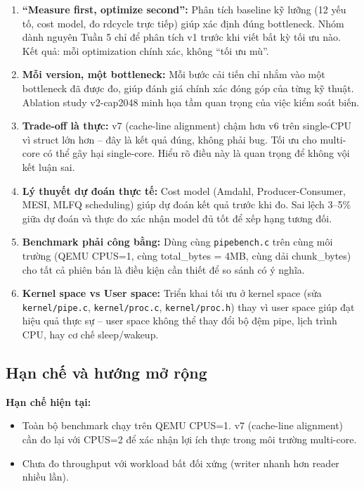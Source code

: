 \documentclass[12pt,a4paper]{article}
\newcommand{\code}[1]{\texttt{#1}}
\newcommand{\tightlist}{\setlength{\itemsep}{2pt}\setlength{\parskip}{0pt}}
\begin{document}
\begin{enumerate}
    \item \textbf{``Measure first, optimize second'':} Phân tích baseline kỹ lưỡng
    (12 yếu tố, cost model, đo rdcycle trực tiếp) giúp xác định đúng bottleneck.
    Nhóm dành nguyên Tuần 5 chỉ để phân tích v1 trước khi viết bất kỳ tối ưu nào.
    Kết quả: mỗi optimization chính xác, không ``tối ưu mù''.

    \item \textbf{Mỗi version, một bottleneck:} Mỗi bước cải tiến chỉ nhắm vào một
    bottleneck đã được đo, giúp đánh giá chính xác đóng góp của từng kỹ thuật. Ablation
    study v2-cap2048 minh họa tầm quan trọng của việc kiểm soát biến.

    \item \textbf{Trade-off là thực:} v7 (cache-line alignment) chậm hơn v6 trên
    single-CPU vì struct lớn hơn -- đây là kết quả đúng, không phải bug. Tối ưu cho
    multi-core có thể gây hại single-core. Hiểu rõ điều này là quan trọng để không
    vội kết luận sai.

    \item \textbf{Lý thuyết dự đoán thực tế:} Cost model (Amdahl, Producer-Consumer,
    MESI, MLFQ scheduling) giúp dự đoán kết quả trước khi đo. Sai lệch 3--5\% giữa
    dự đoán và thực đo xác nhận model đủ tốt để xếp hạng tương đối.

    \item \textbf{Benchmark phải công bằng:} Dùng cùng \code{pipebench.c} trên cùng
    môi trường (QEMU CPUS=1, cùng total\_bytes = 4MB, cùng dải chunk\_bytes) cho tất cả
    phiên bản là điều kiện cần thiết để so sánh có ý nghĩa.

    \item \textbf{Kernel space vs User space:} Triển khai tối ưu ở kernel space
    (sửa \code{kernel/pipe.c}, \code{kernel/proc.c}, \code{kernel/proc.h}) thay vì user
    space giúp đạt hiệu quả thực sự -- user space không thể thay đổi bộ đệm pipe, lịch
    trình CPU, hay cơ chế sleep/wakeup.
\end{enumerate}


\subsection{Hạn chế và hướng mở rộng}

\textbf{Hạn chế hiện tại:}
\begin{itemize}\tightlist
    \item Toàn bộ benchmark chạy trên QEMU CPUS=1. v7 (cache-line alignment) cần đo
    lại với CPUS=2 để xác nhận lợi ích thực trong môi trường multi-core.
    \item Chưa đo throughput với workload bất đối xứng (writer nhanh hơn reader nhiều lần).
\end{itemize}
\end{document}
